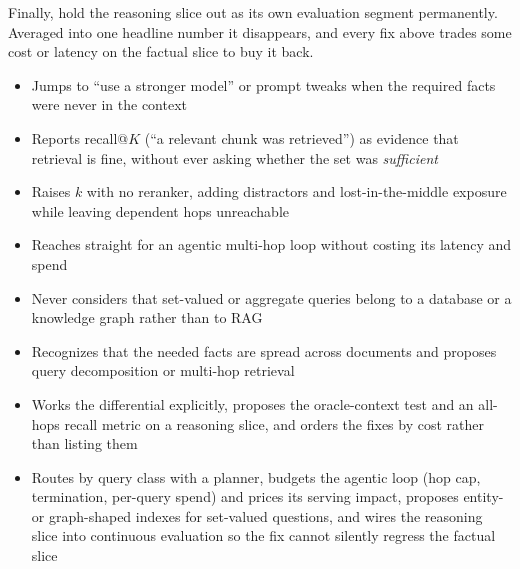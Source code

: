 \begin{interviewq}
Finally, hold the reasoning slice out as its own evaluation segment
permanently.  Averaged into one headline number it disappears, and every fix
above trades some cost or latency on the factual slice to buy it back.

\redflags
\begin{itemize}
    \item Jumps to ``use a stronger model'' or prompt tweaks when the required
          facts were never in the context
    \item Reports recall@$K$ (``a relevant chunk was retrieved'') as evidence
          that retrieval is fine, without ever asking whether the set was
          \emph{sufficient}
    \item Raises $k$ with no reranker, adding distractors and lost-in-the-middle
          exposure while leaving dependent hops unreachable
    \item Reaches straight for an agentic multi-hop loop without costing its
          latency and spend
    \item Never considers that set-valued or aggregate queries belong to a
          database or a knowledge graph rather than to RAG
\end{itemize}


\goodgreat
\begin{itemize}
    \item {} Recognizes that the needed facts are spread across
          documents and proposes query decomposition or multi-hop retrieval
    \item {} Works the differential explicitly, proposes the
          oracle-context test and an all-hops recall metric on a reasoning
          slice, and orders the fixes by cost rather than listing them
    \item {} Routes by query class with a planner, budgets the
          agentic loop (hop cap, termination, per-query spend) and prices its
          serving impact, proposes entity- or graph-shaped indexes for
          set-valued questions, and wires the reasoning slice into continuous
          evaluation so the fix cannot silently regress the factual slice
\end{itemize}

\end{interviewq}

